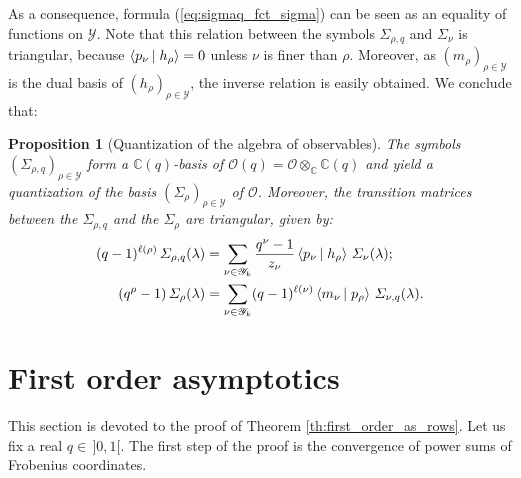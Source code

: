\documentclass[10pt]{amsart}
\newtheorem{proposition}[theorem]{Proposition}
\theoremstyle{remark}
\newcommand{\C}{\mathbb{C}}
\newcommand{\young}{\mathscr{Y}}
\newcommand{\obs}{\mathscr{O}}
\newcommand{\scal}[2]{\left\langle #1\vphantom{#2}\,\right |\left.#2 \vphantom{#1}\right\rangle}
\begin{document}
As a consequence, formula (\ref{eq:sigmaq_fct_sigma}) can be seen as an equality of functions on $\young$. Note that this relation between the symbols $\varSigma_{\rho,q}$ and $\varSigma_\nu$ is triangular, because $\scal{p_\nu}{h_\rho}=0$ unless $\nu$ is finer than  $\rho$. Moreover, as $(m_\rho)_{\rho \in \young}$ is the dual basis of $(h_\rho)_{\rho \in \young}$, the inverse relation is easily obtained. We conclude that:
\begin{proposition}[Quantization of the algebra of observables]
 The symbols $(\varSigma_{\rho,q})_{\rho \in \young}$ form a $\C(q)$-basis of $\obs(q)=\obs \otimes_{\C}\C(q)$ and yield a quantization of the basis $(\varSigma_\rho)_{\rho \in \young}$ of $\obs$. Moreover, the transition matrices between the $\varSigma_{\rho,q}$ and the $\varSigma_\rho$ are triangular, given by:
\begin{align}
(q-1)^{\ell(\rho)}\,\varSigma_{\rho,q}(\lambda)&=\sum_{\nu \in \young_k} \frac{q^\nu-1}{z_\nu}\scal{p_\nu}{h_\rho}\,\varSigma_\nu(\lambda) ;\\
(q^\rho-1)\,\varSigma_\rho(\lambda)&=\sum_{\nu \in \young_k} (q-1)^{\ell(\nu)}\scal{m_\nu}{p_\rho}\,\varSigma_{\nu,q}(\lambda).
\end{align}

\end{proposition}\bigskip 





\section{First order asymptotics}\label{sect:first_order}
This section is devoted to the proof of Theorem \ref{th:first_order_as_rows}. Let us fix a real $q \in \,]0,1[$. The first step of the proof is the convergence of power sums of Frobenius coordinates.
\end{document}
